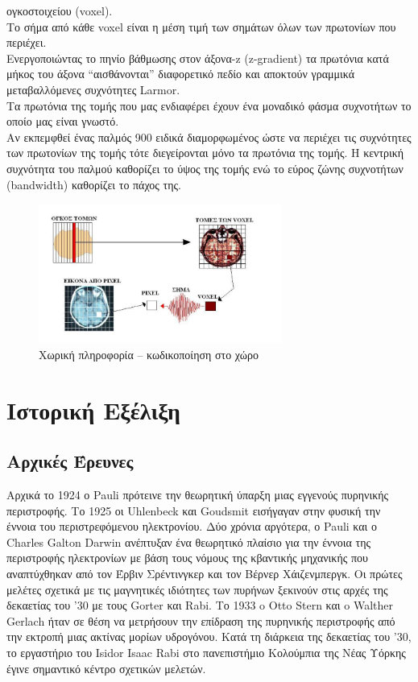 \documentclass{article}
\begin{document}
ογκοστοιχείου	(voxel).	 \\
Το	 σήμα	 από	 κάθε	 voxel	 είναι	 η	 μέση	 τιμή	 των	 σημάτων	 όλων	 των	
πρωτονίων	που	περιέχει.	\\
Ενεργοποιώντας	το	πηνίο	βάθμωσης	στον	άξονα-z	 (z-gradient)	
τα	πρωτόνια	κατά	μήκος	του	άξονα	“αισθάνονται”	διαφορετικό	
πεδίο	 και	 αποκτούν	 γραμμικά	 μεταβαλλόμενες	 συχνότητες	
Larmor.	\\
Τα	 πρωτόνια	 της	 τομής	 που	 μας	 ενδιαφέρει	 έχουν	 ένα	
μοναδικό	φάσμα	συχνοτήτων	το	οποίο	μας	είναι	γνωστό.	 \\
Αν	εκπεμφθεί	ένας	παλμός	900	ειδικά	διαμορφωμένος	ώστε	να	
περιέχει	 τις	 συχνότητες	 των	 πρωτονίων	 της	 τομής	 	 τότε	
διεγείρονται	 μόνο	 τα	 πρωτόνια	 της	 τομής.	 Η	 κεντρική	
συχνότητα	 του	 παλμού	 καθορίζει	 το	 ύψος	 της	 τομής	 ενώ	 το	
εύρος	ζώνης	συχνοτήτων	(bandwidth)	καθορίζει	το	πάχος	της.		\\
\begin{figure}[h!]	
     \centering
  \includegraphics[width=80mm,scale=2]{end.png}
  \caption{Χωρική	πληροφορία	–	κωδικοποίηση	στο	χώρο}
\end{figure}
\clearpage











\section{Ιστορική Εξέλιξη}
\subsection{Αρχικές Έρευνες}
Αρχικά το 1924 ο Pauli πρότεινε την θεωρητική
ύπαρξη μιας εγγενούς πυρηνικής περιστροφής. Το 1925 οι Uhlenbeck και Goudsmit
εισήγαγαν στην φυσική την έννοια του περιστρεφόμενου ηλεκτρονίου. Δύο χρόνια αργότερα,
ο Pauli και ο Charles Galton Darwin ανέπτυξαν ένα θεωρητικό πλαίσιο για την έννοια της
περιστροφής ηλεκτρονίων με βάση τους νόμους της κβαντικής μηχανικής που αναπτύχθηκαν
από τον Έρβιν Σρέντινγκερ και τον Βέρνερ Χάιζενμπεργκ.
Οι πρώτες μελέτες σχετικά με τις μαγνητικές ιδιότητες των πυρήνων ξεκινούν στις
αρχές της δεκαετίας του '30 με τους Gorter και Rabi. Το 1933 o Otto Stern και o Walther
Gerlach ήταν σε θέση να μετρήσουν την επίδραση της πυρηνικής περιστροφής από την
εκτροπή μιας ακτίνας μορίων υδρογόνου. Κατά τη διάρκεια της δεκαετίας του '30, το
εργαστήριο του Isidor Isaac Rabi στο πανεπιστήμιο Κολούμπια της Νέας Υόρκης έγινε
σημαντικό κέντρο σχετικών μελετών.
\end{document}
